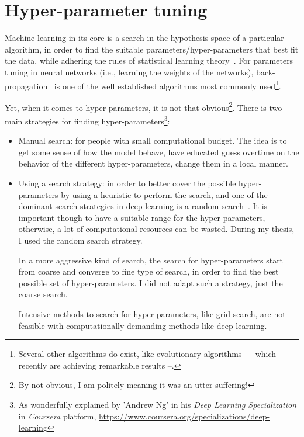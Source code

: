 \chapter{Hyper-parameter tuning}
\par Machine learning in its core is a search in the hypothesis space of a particular algorithm, in order to find the suitable parameters/hyper-parameters that best fit the data, while adhering the rules of statistical learning theory~\citep{hastie01statisticallearning}. For parameters tuning in neural networks (i.e., learning the weights of the networks), back-propagation~\citep{rumelhart1988learning} is one of the well established algorithms most commonly used\footnote{Several other algorithms do exist, like evolutionary algorithms~\citep{eiben2003introduction} -- which recently are achieving remarkable results --.}.

\par Yet, when it comes to hyper-parameters, it is not that obvious\footnote{By not obvious, I am politely meaning it was an utter suffering!}. There is two main strategies for finding hyper-parameters\footnote{As wonderfully explained by 'Andrew Ng' in his \textit{Deep Learning Specialization} in \textit{Coursera} platform, \url{https://www.coursera.org/specializations/deep-learning}}:
\begin{itemize}
  \item Manual search: for people with small computational budget. The idea is to get some sense of how the model behave, have educated guess overtime on the behavior of the different hyper-parameters, change them in a local manner.
  \item Using a search strategy: in order to better cover the possible hyper-parameters by using a heuristic to perform the search, and one of the dominant search strategies in deep learning is a random search~\cite{bergstra2012random}. It is important though to have a suitable range for the hyper-parameters, otherwise, a lot of computational resources can be wasted. During my thesis, I used the random search strategy.

  In a more aggressive kind of search, the search for hyper-parameters start from coarse and converge to fine type of search, in order to find the best possible set of hyper-parameters. I did not adapt such a strategy, just the coarse search.

  Intensive methods to search for hyper-parameters, like grid-search, are not feasible with computationally demanding methods like deep learning.
\end{itemize}

